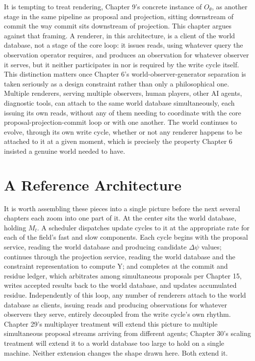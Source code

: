 It is tempting to treat rendering, Chapter 9's concrete instance of \(O_\theta\), as another stage in the same pipeline as proposal and projection, sitting downstream of commit the way commit sits downstream of projection. This chapter argues against that framing. A renderer, in this architecture, is a client of the world database, not a stage of the core loop: it issues reads, using whatever query the observation operator requires, and produces an observation for whatever observer it serves, but it neither participates in nor is required by the write cycle itself. This distinction matters once Chapter 6's world-observer-generator separation is taken seriously as a design constraint rather than only a philosophical one. Multiple renderers, serving multiple observers, human players, other AI agents, diagnostic tools, can attach to the same world database simultaneously, each issuing its own reads, without any of them needing to coordinate with the core proposal-projection-commit loop or with one another. The world continues to evolve, through its own write cycle, whether or not any renderer happens to be attached to it at a given moment, which is precisely the property Chapter 6 insisted a genuine world needed to have.

\section{A Reference Architecture}

It is worth assembling these pieces into a single picture before the next several chapters each zoom into one part of it. At the center sits the world database, holding \(M_t\). A scheduler dispatches update cycles to it at the appropriate rate for each of the field's fast and slow components. Each cycle begins with the proposal service, reading the world database and producing candidate \(\Delta\psi\) values; continues through the projection service, reading the world database and the constraint representation to compute Y; and completes at the commit and residue ledger, which arbitrates among simultaneous proposals per Chapter 15, writes accepted results back to the world database, and updates accumulated residue. Independently of this loop, any number of renderers attach to the world database as clients, issuing reads and producing observations for whatever observers they serve, entirely decoupled from the write cycle's own rhythm. Chapter 29's multiplayer treatment will extend this picture to multiple simultaneous proposal streams arriving from different agents; Chapter 30's scaling treatment will extend it to a world database too large to hold on a single machine. Neither extension changes the shape drawn here. Both extend it.

